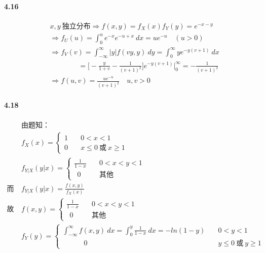\documentclass[
]{article}
\begin{document}
\hypertarget{header-n17}{%
\paragraph{4.16}\label{header-n17}}

\begin{align}
&x,y\ 独立分布 \Rightarrow f(x,y)=f_X(x)f_Y(y)=e^{-x-y}\\
&\Rightarrow f_U(u)=\int_0^ue^{-x}e^{-u+x}\ dx=ue^{-u} \quad (u>0)\\
&\Rightarrow f_V(v)=\int_{-\infty}^{\infty}|y|f(vy,y)\ dy =\int_0^\infty ye^{-y(v+1)}\ dx \\&\quad\quad\quad\quad
= \Big[-\frac{y}{1+v}-\frac1{(v+1)^2}\Big]e^{-y(v+1)}\bigg |_0^\infty=-\frac1{(v+1)^2}\\
&\Rightarrow f(u,v)=\frac{ue^{-u}}{(v+1)^2} \quad u,v>0
\end{align}

\hypertarget{header-n20}{%
\paragraph{4.18}\label{header-n20}}

\begin{align}
&由题知：\\
&f_X(x) = \begin{cases}1 \quad &0<x<1\\0 \quad &x\le0\ 或\ x\ge1
\end{cases}\\
 &f_{Y|X}(y|x) = \begin{cases}\frac{1}{1-x} \quad &0<x<y<1 \\ \ \  0 &其他
\end{cases}\\
而\ &f_{Y|X}(y|x) = \frac{f(x,y)}{f_X(x)}\\
故\ &f(x,y)=\begin{cases}\frac{1}{1-x} \quad &0<x<y<1\\ \ \ 0 &其他 \end{cases}\\
   &f_Y(y) = \begin{cases}\int_{-\infty}^{\infty}f(x,y)\ dx = \int_0^y\frac{1}{1-x}\ dx= -ln(1-y) \quad &0<y<1\\
             \quad \quad \quad 0 &y\le0\ 或\ y\ge1
\end{cases}\\\

\end{align}
\end{document}
